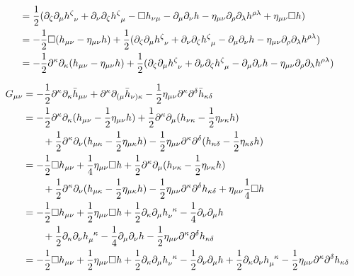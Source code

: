 \documentclass[12pt,a4]{article}
\begin{document}
\begin{enumerate}
\begin{align*}
                  &= \frac{1}{2} (\partial_\zeta \partial_\mu\tensor{h}{^\zeta_\nu} + \partial_\nu \partial_\zeta \tensor{h}{^\zeta_\mu} - \Box h_{\nu\mu} - \partial_\mu \partial_\nu h -\eta_{\mu\nu}\partial_\rho \partial_\lambda\tensor{h}{^\rho^\lambda} + \eta_{\mu\nu}\Box h)\\
                  &= -\frac{1}{2}\Box( h_{\mu\nu} -  \eta_{\mu\nu} h) + \frac{1}{2} (\partial_\zeta \partial_\mu\tensor{h}{^\zeta_\nu} + \partial_\nu \partial_\zeta \tensor{h}{^\zeta_\mu} -  \partial_\mu \partial_\nu h -\eta_{\mu\nu}\partial_\rho \partial_\lambda\tensor{h}{^\rho^\lambda})\\
                  &= -\frac{1}{2}\partial^\kappa\partial_\kappa( h_{\mu\nu} -  \eta_{\mu\nu} h) + \frac{1}{2} (\partial_\zeta \partial_\mu\tensor{h}{^\zeta_\nu} + \partial_\nu \partial_\zeta \tensor{h}{^\zeta_\mu} -  \partial_\mu \partial_\nu h -\eta_{\mu\nu}\partial_\rho \partial_\lambda\tensor{h}{^\rho^\lambda})
    \end{align*}

    \begin{align*}
      G_{\mu\nu}  &= -\frac{1}{2}\partial^\kappa \partial_\kappa \bar{h}_{\mu\nu} + \partial^\kappa \partial_{(\mu} \bar{h}_{\nu)\kappa} - \frac{1}{2}\eta_{\mu\nu} \partial^\kappa \partial^\delta \bar{h}_{\kappa\delta}\\
                  &= -\frac{1}{2}\partial^\kappa \partial_\kappa (h_{\mu\nu} - \frac{1}{2}\eta_{\mu\nu}h) + \frac{1}{2}\partial^\kappa \partial_{\mu} (h_{\nu\kappa} - \frac{1}{2}\eta_{\nu\kappa}h)\\
                  & \qquad + \frac{1}{2}\partial^\kappa \partial_{\nu} (h_{\mu\kappa} - \frac{1}{2}\eta_{\mu\kappa}h) - \frac{1}{2}\eta_{\mu\nu} \partial^\kappa \partial^\delta (h_{\kappa\delta} - \frac{1}{2}\eta_{\kappa\delta}h)\\
                  &= -\frac{1}{2}\Box h_{\mu\nu} + \frac{1}{4}\eta_{\mu\nu}\Box h + \frac{1}{2}\partial^\kappa \partial_{\mu} (h_{\nu\kappa} - \frac{1}{2}\eta_{\nu\kappa}h)\\
                  & \qquad + \frac{1}{2}\partial^\kappa \partial_{\nu} (h_{\mu\kappa} - \frac{1}{2}\eta_{\mu\kappa}h) - \frac{1}{2}\eta_{\mu\nu} \partial^\kappa \partial^\delta h_{\kappa\delta} + \eta_{\mu\nu}\frac{1}{4}\Box h\\
                  &= -\frac{1}{2}\Box h_{\mu\nu} + \frac{1}{2}\eta_{\mu\nu}\Box h + \frac{1}{2}\partial_\kappa \partial_{\mu} \tensor{h}{_\nu^\kappa} - \frac{1}{4}\partial_\nu \partial_{\mu}h\\
                  & \qquad + \frac{1}{2}\partial_\kappa \partial_{\nu} \tensor{h}{_\mu^\kappa} - \frac{1}{4} \partial_\mu \partial_{\nu} h - \frac{1}{2}\eta_{\mu\nu} \partial^\kappa \partial^\delta h_{\kappa\delta}\\
                  &= -\frac{1}{2}\Box h_{\mu\nu} + \frac{1}{2}\eta_{\mu\nu}\Box h + \frac{1}{2}\partial_\kappa \partial_{\mu} \tensor{h}{_\nu^\kappa} - \frac{1}{2}\partial_\nu \partial_{\mu}h + \frac{1}{2}\partial_\kappa \partial_{\nu} \tensor{h}{_\mu^\kappa} - \frac{1}{2}\eta_{\mu\nu} \partial^\kappa \partial^\delta h_{\kappa\delta}\\
    \end{align*}


\end{enumerate}
\end{document}
